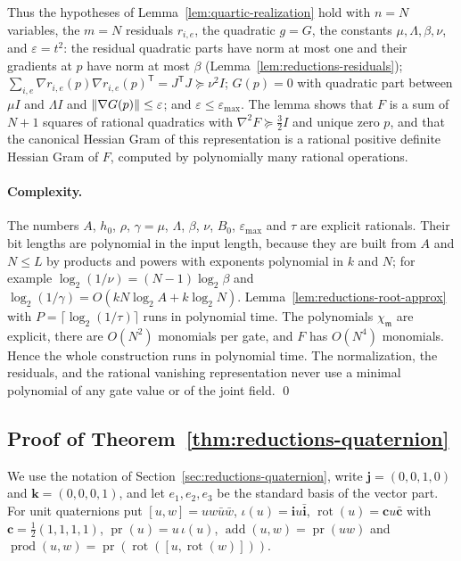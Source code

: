 Thus the hypotheses of Lemma~\ref{lem:quartic-realization} hold with $n=N$
variables, the $m=N$ residuals $r_{i,e}$, the quadratic $g=G$, the constants
$\mu,\Lambda,\beta,\nu$, and $\varepsilon=t^2$: the residual quadratic parts have
norm at most one and their gradients at $p$ have norm at most $\beta$
(Lemma~\ref{lem:reductions-residuals}); $\sum_{i,e}\nabla r_{i,e}(p)\nabla
r_{i,e}(p)^{\mathsf T}=J^{\mathsf T}J\succeq\nu^2I$; $G(p)=0$ with quadratic part
between $\mu I$ and $\Lambda I$ and $\left\lVert\nabla G(p)\right\rVert\le\varepsilon$; and
$\varepsilon\le\varepsilon_{\max}$. The lemma shows that $F$ is a sum of $N+1$
squares of rational quadratics with $\nabla^2F\succeq\frac32I$ and unique zero
$p$, and that the canonical Hessian Gram of this representation is a rational
positive definite Hessian Gram of $F$, computed by polynomially many rational
operations.

\paragraph{Complexity.}
The numbers $A$, $h_0$, $\rho$, $\gamma=\mu$, $\Lambda$, $\beta$, $\nu$, $B_0$, $\varepsilon_{\max}$ and
$\tau$ are explicit rationals. Their bit lengths are polynomial in the
input length, because they are built from $A$ and $N\le L$ by products and powers
with exponents polynomial in $k$ and $N$; for example $\log_2(1/\nu)=(N-1)\log_2\beta$ and
$\log_2(1/\gamma)=O(kN\log_2A+k\log_2N)$. Lemma~\ref{lem:reductions-root-approx}
with $P=\lceil\log_2(1/\tau)\rceil$ runs in polynomial time. The polynomials
$\chi_{\mathfrak m}$ are explicit, there are $O(N^2)$ monomials per gate, and $F$
has $O(N^4)$ monomials. Hence the whole construction runs in polynomial time. The
normalization, the residuals, and the rational vanishing representation never
use a minimal polynomial of any gate value or of the joint field. \qed

\subsection{Proof of Theorem~\ref{thm:reductions-quaternion}}
\label{app:reductions-quaternion-compiler}

We use the notation of Section~\ref{sec:reductions-quaternion}, write
$\mathbf j=(0,0,1,0)$ and $\mathbf k=(0,0,0,1)$, and let
$e_1,e_2,e_3$ be the standard basis of the vector part. For unit quaternions put
$[u,w]=uw\bar u\bar w$, $\iota(u)=\mathbf iu\bar{\mathbf i}$,
$\operatorname{rot}(u)=\mathbf cu\bar{\mathbf c}$ with $\mathbf c=\frac12(1,1,1,1)$, $\operatorname{pr}(u)=u\,\iota(u)$,
$\operatorname{add}(u,w)=\operatorname{pr}(uw)$ and $\operatorname{prod}(u,w)=\operatorname{pr}(\operatorname{rot}([u,\operatorname{rot}(w)]))$.

